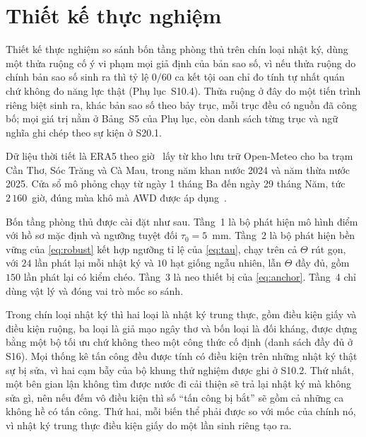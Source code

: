 \section{Thiết kế thực nghiệm}
\label{sec:design}

Thiết kế thực nghiệm so sánh bốn tầng phòng thủ trên chín loại nhật ký, dùng một thửa
ruộng cố ý vi phạm mọi giả định của bản sao số, vì nếu thửa ruộng do chính bản sao số sinh
ra thì tỷ lệ $0/60$ ca kết tội oan chỉ đo tính tự nhất quán chứ không đo năng lực thật
(Phụ lục~S10.4). Thửa ruộng ở đây do một tiến trình riêng biệt sinh ra, khác bản sao số
theo bảy trục, mỗi trục đều có nguồn đã công bố; mọi giá trị nằm ở Bảng~S5 của Phụ lục,
còn danh sách từng trục và ngữ nghĩa ghi chép theo sự kiện ở S20.1.

Dữ liệu thời tiết là ERA5 theo giờ~\cite{hersbach2020} lấy từ kho lưu trữ
Open-Meteo cho ba trạm Cần Thơ, Sóc Trăng và Cà Mau, trong năm khan nước 2024 và năm thừa nước 2025. Cửa sổ mô phỏng chạy từ ngày 1 tháng Ba đến ngày 29
tháng Năm, tức $2\,160$~giờ, đúng mùa khô mà AWD được áp dụng~\cite{tuong2003}.

Bốn tầng phòng thủ được cài đặt như sau. Tầng~1 là bộ phát hiện mô hình điểm với
hồ sơ mặc định và ngưỡng tuyệt đối $\tau_0=5$~mm. Tầng~2 là bộ phát hiện bền vững
của \eqref{eq:robust} kết hợp ngưỡng tỉ lệ của \eqref{eq:tau}, chạy trên cả
$\Theta$ rút gọn, với $24$ lần phát lại mỗi nhật ký và $10$ hạt giống ngẫu nhiên,
lẫn $\Theta$ đầy đủ, gồm $150$ lần phát lại có kiểm chéo. Tầng~3 là neo thiết bị của
\eqref{eq:anchor}. Tầng~4 chỉ dùng vật lý và đóng vai trò mốc so sánh.

Trong chín loại nhật ký thì hai loại là nhật ký trung thực, gồm điều kiện giấy và điều
kiện ruộng, ba loại là giả mạo ngây thơ và bốn loại là đối kháng, được dựng bằng một bộ
tối ưu chứ không theo một công thức cố định (danh sách đầy đủ ở S16). Mọi thống kê tấn
công đều được tính có điều kiện trên những nhật ký thật sự bị sửa, vì hai cạm bẫy của bộ
khung thử nghiệm được ghi ở S10.2. Thứ nhất, một bên gian lận không tìm được nước đi cải
thiện sẽ trả lại nhật ký mà không sửa gì, nên nếu đếm vô điều kiện thì số ``tấn công bị
bắt'' sẽ gồm cả những ca không hề có tấn công. Thứ hai, mỗi biến thể phải được so với mốc
của chính nó, vì nhật ký trung thực điều kiện giấy do một lần sinh riêng tạo ra.

